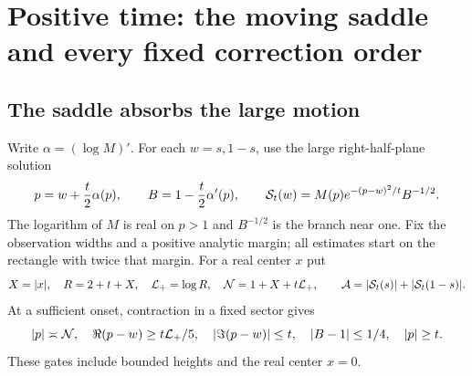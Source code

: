 \section{Positive time: the moving saddle and every fixed correction order}
\label{sec:positive}

\subsection{The saddle absorbs the large motion}
Write $\alpha=(\log M)'$. For each $w=s,1-s$, use the large
right-half-plane solution
\begin{equation}
 p=w+\frac t2\alpha(p),\qquad
 B=1-\frac t2\alpha'(p),\qquad
 \mathcal S_t(w)=M(p)e^{-(p-w)^2/t}B^{-1/2}.
 \label{eq:positive-saddle}
\end{equation}
The logarithm of $M$ is real on $p>1$ and $B^{-1/2}$ is the branch
near one. Fix the observation widths and a positive analytic margin;
all estimates start on the rectangle with twice that margin. For a
real center $x$ put
\begin{equation}
 X=|x|,\quad R=2+t+X,\quad \mathcal L_+=\log R,\quad
 \mathcal N=1+X+t\mathcal L_+,\qquad
 \mathcal A=|\mathcal S_t(s)|+|\mathcal S_t(1-s)|.
 \label{eq:positive-scales}
\end{equation}
At a sufficient onset, contraction in a fixed sector gives
\begin{equation}
 |p|\asymp\mathcal N,\quad \Re(p-w)\ge t\mathcal L_+/5,\quad
 |\Im(p-w)|\le t,\quad |B-1|\le1/4,\quad |p|\ge t.
 \label{eq:saddle-gates}
\end{equation}
These gates include bounded heights and the real center $x=0$.

